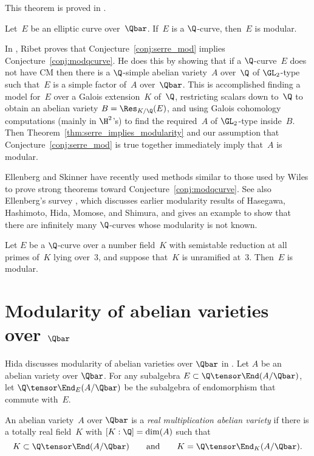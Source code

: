 \documentclass{report}
\begin{document}
This theorem is proved in \cite[\S5]{ribet:abvars}.



\begin{conjecture}[Ribet]\label{conj:modqcurve}
  Let~$E$ be an elliptic curve over~$\Qbar$.  If~$E$ is a $\Q$-curve,
  then~$E$ is modular.
\end{conjecture}
In \cite[\S6]{ribet:abvars}, Ribet proves that
Conjecture~\ref{conj:serre_mod} implies
Conjecture~\ref{conj:modqcurve}.  He does this by showing that if a
$\Q$-curve~$E$ does not have CM then there is a $\Q$-simple abelian
variety~$A$ over~$\Q$ of $\GL_2$-type such that~$E$ is a simple factor
of~$A$ over~$\Qbar$.  This is accomplished finding a model for~$E$
over a Galois extension~$K$ of~$\Q$, restricting scalars down to~$\Q$
to obtain an abelian variety $B=\Res_{K/\Q}(E)$, and using Galois
cohomology computations (mainly in $\H^2$'s) to find the required~$A$
of $\GL_2$-type inside~$B$.  Then
Theorem~\ref{thm:serre_implies_modularity} and our assumption that
Conjecture~\ref{conj:serre_mod} is true together immediately imply
that~$A$ is modular.

Ellenberg and Skinner \cite{ellenberg-skinner:modularity} have
recently used methods similar to those used by Wiles to prove strong
theorems toward Conjecture~\ref{conj:modqcurve}. See also Ellenberg's
survey \cite{ellenberg:qcurves_survey}, which discusses earlier
modularity results of Hasegawa, Hashimoto, Hida, Momose, and Shimura,
and gives an example to show that there are infinitely many
$\Q$-curves whose modularity is not known.


\begin{theorem}
  Let $E$ be a $\Q$-curve over a number field~$K$ with semistable
  reduction at all primes of~$K$ lying over~$3$, and suppose
  that~$K$ is unramified at~$3$. Then~$E$ is modular.
\end{theorem}

\section{Modularity of abelian varieties over $\Qbar$}
Hida discusses modularity of abelian varieties over $\Qbar$ in
\cite{hida:modularity}.  Let $A$ be an abelian variety over $\Qbar$.
For any subalgebra $E\subset \Q\tensor \End(A/\Qbar)$, let $\Q\tensor
\End_E(A/\Qbar)$ be the subalgebra of endomorphism that commute
with~$E$.

\begin{definition}
  An abelian variety~$A$ over $\Qbar$ is a {\em real multiplication
    abelian variety} if there is a totally real field~$K$ with
  $[K:\Q]=\dim(A)$ such that
 $$K\subset \Q\tensor \End(A/\Qbar) \qquad\text{and}\qquad
K = \Q\tensor\End_{K}(A/\Qbar).$$
\end{definition}
\end{document}
